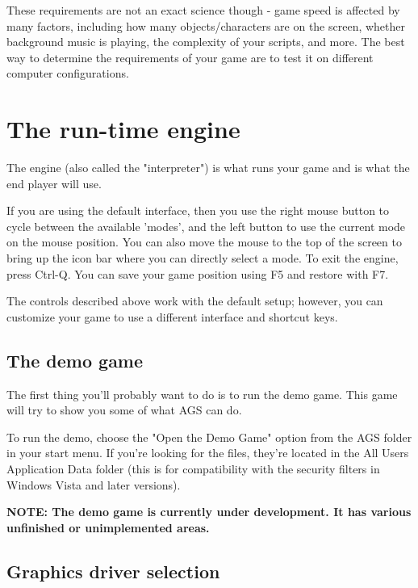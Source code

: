 These requirements are not an exact science though - game speed is affected by many
factors, including how many objects/characters are on the screen, whether background music
is playing, the complexity of your scripts, and more. The best way to determine the requirements
of your game are to test it on different computer configurations.


\chapter{The run-time engine}%

The engine (also called the "interpreter") is what runs your game and is what
the end player will use.

If you are using the default interface, then you use the right mouse button to
cycle between the available 'modes', and the left button to use the current
mode on the mouse position. You can also move the mouse to the top of the
screen to bring up the icon bar where you can directly select a mode.
To exit the engine, press Ctrl-Q. You can save your game position using F5
and restore with F7.

The controls described above work with the default setup; however, you can
customize your game to use a different interface and shortcut keys.


\section{The demo game}%

The first thing you'll probably want to do is to run the demo game. This
game will try to show you some of what AGS can do.

To run the demo, choose the "Open the Demo Game" option from the AGS folder
in your start menu. If you're looking for the files, they're located in the
All Users Application Data folder (this is for compatibility with the security filters in Windows Vista and later versions).

\bf{NOTE:} The demo game is currently under development. It has various unfinished
or unimplemented areas.



\section{Graphics driver selection}\label{GraphicsDriver}%

